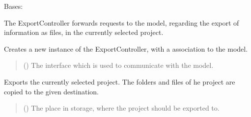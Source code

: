 \documentclass[letterpaper,10pt,english]{sphinxmanual}
\begin{document}
\begin{fulllineitems}
\label{\detokenize{apidoc/src.osm_configurator.control:src.osm_configurator.control.export_controller.ExportController}}
\pysigstartsignatures
{}
\pysigstopsignatures
\sphinxAtStartPar
Bases: 

\sphinxAtStartPar
The ExportController forwards requests to the model, regarding the export of information as files, in the currently selected project.

\begin{fulllineitems}
\label{\detokenize{apidoc/src.osm_configurator.control:src.osm_configurator.control.export_controller.ExportController.__init__}}
\pysigstartsignatures
{}
\pysigstopsignatures
\sphinxAtStartPar
Creates a new instance of the ExportController, with a association to the model.
\begin{quote}\begin{description}
\sphinxAtStartPar
{} ({\hyperref[\detokenize{apidoc/src.osm_configurator.model.application:src.osm_configurator.model.application.application_interface.IApplication}]{}}) \textendash{} The interface which is used to communicate with the model.

\end{description}\end{quote}

\end{fulllineitems}


\begin{fulllineitems}
\label{\detokenize{apidoc/src.osm_configurator.control:src.osm_configurator.control.export_controller.ExportController.export_project}}
\pysigstartsignatures
{}
\pysigstopsignatures
\sphinxAtStartPar
Exports the currently selected project.
The folders and files of he project are copied to the given destination.
\begin{quote}\begin{description}
\sphinxAtStartPar
{} () \textendash{} The place in storage, where the project should be exported to.


\end{description}
\end{quote}
\end{fulllineitems}
\end{fulllineitems}
\end{document}
